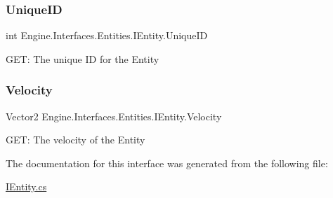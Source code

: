 \subsubsection{\texorpdfstring{Unique\+ID}{UniqueID}}
{\footnotesize\ttfamily int Engine.\+Interfaces.\+Entities.\+I\+Entity.\+Unique\+ID\hspace{0.3cm}{\ttfamily [get]}}



G\+ET\+: The unique ID for the Entity 

\mbox{\label{a00438_a6569977576ff585b7a883f11fc073a6d}} 
\subsubsection{\texorpdfstring{Velocity}{Velocity}}
{\footnotesize\ttfamily Vector2 Engine.\+Interfaces.\+Entities.\+I\+Entity.\+Velocity\hspace{0.3cm}{\ttfamily [get]}}



G\+ET\+: The velocity of the Entity 



The documentation for this interface was generated from the following file\+:\begin{DoxyCompactItemize}
\item 
\hyperlink{a00110}{I\+Entity.\+cs}\end{DoxyCompactItemize}
